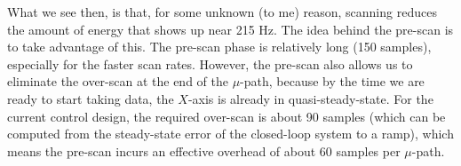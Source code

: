 \documentclass[twocolumn,oneside]{IEEEtran/IEEEtran}
\begin{document}
What we see then, is that, for some unknown (to me) reason, scanning reduces the
amount of energy that shows up near 215 Hz. The idea behind the pre-scan is to
take advantage of this. The pre-scan phase is relatively long (150 samples),
especially for the faster scan rates. However, the pre-scan also allows us to
eliminate the over-scan at the end of the $\mu$-path, because by the time we are
ready to start taking data, the $X$-axis is already in quasi-steady-state. For
the current control design, the required over-scan is about 90 samples (which
can be computed from the steady-state error of the closed-loop system to a
ramp), which means the pre-scan incurs an effective overhead of about 60 samples
per $\mu$-path.



\end{document}
